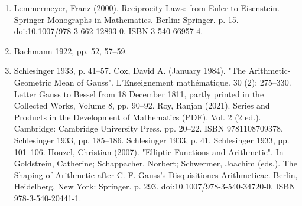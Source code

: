 \begin{enumerate}
\item Lemmermeyer, Franz (2000). Reciprocity Laws: from Euler to Eisenstein. Springer Monographs in Mathematics. Berlin: Springer. p. 15. doi:10.1007/978-3-662-12893-0. ISBN 3-540-66957-4.
\item Bachmann 1922, pp. 52, 57–59.
\item Schlesinger 1933, p. 41–57.
 Cox, David A. (January 1984). "The Arithmetic-Geometric Mean of Gauss". L'Enseignement mathématique. 30 (2): 275–330.
 Letter Gauss to Bessel from 18 December 1811, partly printed in the Collected Works, Volume 8, pp. 90–92.
 Roy, Ranjan (2021). Series and Products in the Development of Mathematics (PDF). Vol. 2 (2 ed.). Cambridge: Cambridge University Press. pp. 20–22. ISBN 9781108709378.
 Schlesinger 1933, pp. 185–186.
 Schlesinger 1933, p. 41.
 Schlesinger 1933, pp. 101–106.
 Houzel, Christian (2007). "Elliptic Functions and Arithmetic". In Goldstrein, Catherine; Schappacher, Norbert; Schwermer, Joachim (eds.). The Shaping of Arithmetic after C. F. Gauss's Disquisitiones Arithmeticae. Berlin, Heidelberg, New York: Springer. p. 293. doi:10.1007/978-3-540-34720-0. ISBN 978-3-540-20441-1.
\end{enumerate}